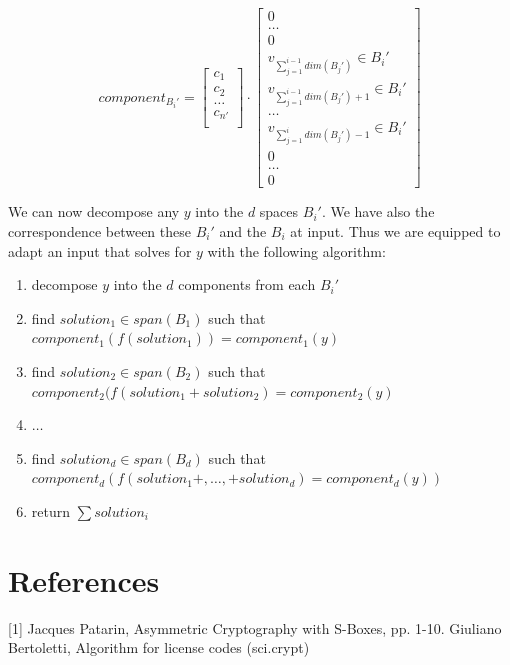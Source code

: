 \documentclass{article}
\begin{document}
\begin{equation*}
component_{B_i'}
=
\begin{bmatrix}
c_1 \\
c_2 \\
\ldots \\
c_{n'} \\
\end{bmatrix}
\cdot
\begin{bmatrix}
0 \\
\ldots \\
0 \\
v_{\sum_{j=1}^{i-1} dim(B_j')} \in B_i' \\
v_{\sum_{j=1}^{i-1} dim(B_j') + 1} \in B_i' \\
\ldots \\
v_{\sum_{j=1}^{i} dim(B_j') - 1} \in B_i' \\
0 \\
\ldots \\
0
\end{bmatrix}
\end{equation*}

We can now decompose any $y$ into the $d$ spaces $B_i'$.
We have also the correspondence between these $B_i'$ and the $B_i$ at input.
Thus we are equipped to adapt an input that solves for $y$ with the following algorithm:

\begin{enumerate}
\item decompose $y$ into the $d$ components from each $B_i'$
\item find $solution_1 \in span(B_1)$ such that\\
$component_1(f(solution_1))=component_1(y)$
\item find $solution_2 \in span(B_2)$ such that\\
$component_2(f(solution_1+solution_2)=component_2(y)$
\item $\ldots$
\item find $solution_d \in span(B_d)$ such that\\
$component_d(f(solution_1+,\ldots ,+solution_d)=component_d(y))$
\item return $\sum{solution_i}$
\end{enumerate}

\section*{References}
[1] Jacques Patarin, Asymmetric Cryptography with S-Boxes, pp. 1-10. \newline
[2] Giuliano Bertoletti, Algorithm for license codes (sci.crypt)
\end{document}
